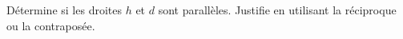 %
%
Détermine si les droites $h$ et $d$ sont parallèles. Justifie en utilisant
    la réciproque ou la contraposée.
    \begin{tasks}
        \task {}
        \task {}
        \task {}
    \end{tasks}
